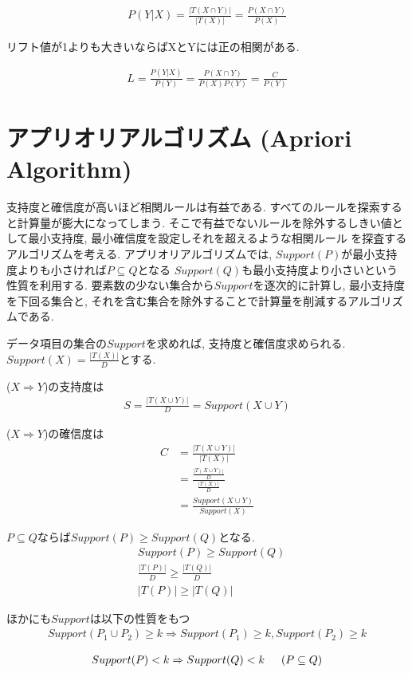 \documentclass[dvipdfmx, 10pt]{jsarticle}
\begin{document}
\begin{align*}
    P(Y|X) = \frac{|T(X \cap Y)|}{|T(X)|} = \frac{P(X \cap Y)}{P(X)}
\end{align*}

リフト値が1よりも大きいならばXとYには正の相関がある. 

\begin{align*}
    L = \frac{P(Y|X)}{P(Y)} 
    = \frac{P(X \cap Y)}{P(X) P(Y)} 
    = \frac{C}{P(Y)}
\end{align*}

\section*{アプリオリアルゴリズム (Apriori Algorithm)}
支持度と確信度が高いほど相関ルールは有益である. すべてのルールを探索すると計算量が膨大になってしまう. 
そこで有益でないルールを除外するしきい値として最小支持度, 最小確信度を設定しそれを超えるような相関ルール
を探査するアルゴリズムを考える. アプリオリアルゴリズムでは, \(Support(P)\)が最小支持度よりも小さければ\(P \subseteq Q\)となる
\(Support(Q)\)も最小支持度より小さいという性質を利用する. 要素数の少ない集合から\(Support\)を逐次的に計算し, 
最小支持度を下回る集合と, それを含む集合を除外することで計算量を削減するアルゴリズムである. 

\begin{oframed}
    データ項目の集合の\(Support\)を求めれば, 支持度と確信度求められる. 
    \(Support(X) = \frac{|T(X)|}{D}\)とする. 

    (\(X \Rightarrow Y\))の支持度は
    \begin{align*}
        S = \frac{|T(X \cup Y)|}{D} = Support(X \cup Y)
    \end{align*}

    (\(X \Rightarrow Y\))の確信度は
    \begin{align*}
        C &= \frac{|T(X \cup Y)|}{|T(X)|}\\
        &= \frac{\frac{|T(X \cup Y)|}{D}}{\frac{|T(X)|}{D}}\\
        &= \frac{Support(X \cup Y)}{Support(X)}
    \end{align*}

    \(P \subseteq Q\)ならば\(Support(P) \geq Support(Q)\)となる. 
    \begin{align*}
        & Support(P) \geq Support(Q) \\
        & \frac{|T(P)|}{D} \geq \frac{|T(Q)|}{D} \\
        & |T(P)| \geq |T(Q)|
    \end{align*}

    ほかにも\(Support\)は以下の性質をもつ
    \begin{align*}
        Support(P_1 \cup P_2) \geq k
        \Rightarrow Support(P_1) \geq k, Support(P_2) \geq k
    \end{align*}

    \begin{align*}
        Support(P) < k 
        \Rightarrow Support(Q) < k \indent (P \subseteq Q)
    \end{align*}
\end{oframed}
\end{document}
